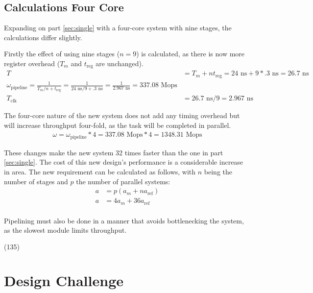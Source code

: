 \documentclass[11pt]{article}
\begin{document}
\subsection{Calculations Four Core}

Expanding on part \ref{sec:single} with a four-core system with nine stages, the calculations differ slightly. 

Firstly the effect of using nine stages ($n = 9$) is calculated, as there is now more register overhead\cite{dally} ($T_m$ and $t_{\text{reg}}$ are unchanged).
\begin{align}
    T &= T_m + nt_{\text{reg}} = 24\text{ ns} + 9*.3\text{ ns} = 26.7\text{ ns}\\
    \omega_{\text{pipeline}} = \frac{1}{T_m/n+t_{\text{reg}}} = \frac{1}{24\text{ ns}/9+.3\text{ ns}} = \frac{1}{2.967\text{ ns}} = 337.08\text{ Mops}\\
    T_{\text{clk}} &=  26.7\text{ ns} / 9 = 2.967\text{ ns}
\end{align}

The four-core nature of the new system does not add any timing overhead but will increase throughput four-fold, as the task will be completed in parallel.
\begin{align}
    \omega = \omega_{\text{pipeline}} * 4 = 337.08\text{ Mops} * 4 = 1348.31 \text{ Mops}
\end{align}

These changes make the new system 32 times faster than the one in part \ref{sec:single}.
The cost of this new design's performance is a considerable increase in area.
The new requirement can be calculated as follows, with $n$ being the number of stages and $p$ the number of parallel systems:
\begin{align}
    a &= p(a_m + na_{\text{ref}}) \\ 
    a &= 4a_m + 36a_{\text{ref}} \\ 
\end{align}

Pipelining must also be done in a manner that avoids bottlenecking the system, as the slowest module limits throughput.

(135)

\section{Design Challenge}
\end{document}
